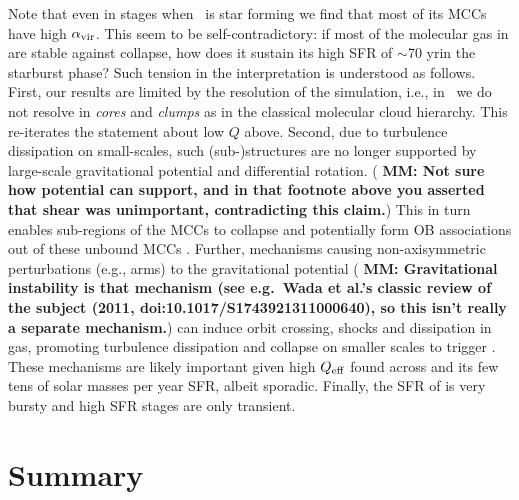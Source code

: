 \IfFileExists{emulateapjlegacy.cls}{\documentclass[iop]{emulateapjlegacy}}{\documentclass[iop]{emulateapj}}
\newcommand{\MM}[1]{({\bf \color{mmcolor} MM: #1})}
\begin{document}
Note that even in stages when \flower~is star forming we find that most of its MCCs have high $\alpha_{\rm vir}$. This seem to be self-contradictory: if most of the molecular gas in \flower are stable against collapse, how does it sustain its high SFR of $\sim$70\,\Msun\,yr\pmOne in the starburst phase? Such tension in the interpretation is understood as follows.
%
First, our results are limited by the resolution of the simulation, i.e., in \flower~we do not resolve \SF in {\it cores} and {\it clumps} as in the classical molecular cloud hierarchy. This re-iterates the statement about low $Q$ above.
%
Second, due to turbulence dissipation on small-scales, such
(sub-)structures are no longer supported by large-scale gravitational
potential and differential rotation.  \MM{Not sure how potential can
  support, and in that footnote above you asserted that shear was
  unimportant, contradicting this claim.} This in turn enables sub-regions of the MCCs to collapse and potentially form OB associations out of these unbound MCCs \citep{Clark04a, Clark05a}.
%
Further, mechanisms causing non-axisymmetric perturbations (e.g.,
arms) to the gravitational potential \MM{Gravitational instability is
  that mechanism (see e.g.\ Wada et al.'s classic review of the
  subject (2011, doi:10.1017/S1743921311000640), so this isn't really a separate mechanism.} can induce orbit crossing, shocks and dissipation in gas, promoting turbulence dissipation and collapse on smaller scales to trigger \SF. These mechanisms are likely important given high $Q_{\rm eff}$ found across \flower and its few tens of solar masses per year SFR, albeit sporadic.
Finally, the SFR of \flower is very bursty and high SFR stages are only transient.

\section{Summary}      \label{sec:conclusion}
\end{document}
